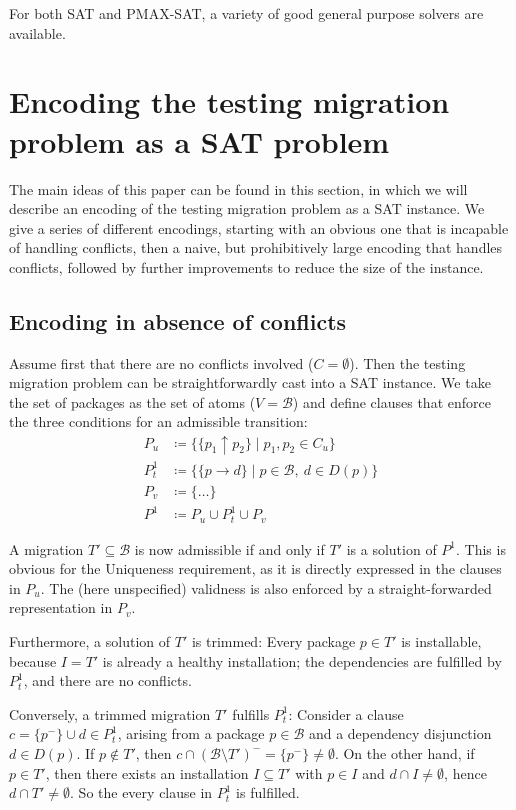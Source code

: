 \documentclass[halfparskip,11pt]{scrartcl}
\begin{document}
For both SAT and PMAX-SAT, a variety of good general purpose solvers are available.

\section{Encoding the testing migration problem as a SAT problem}

The main ideas of this paper can be found in this section, in which we will describe an encoding of the testing migration problem as a SAT instance. We give a series of different encodings, starting with an obvious one that is incapable of handling conflicts, then a naive, but prohibitively large encoding that handles conflicts, followed by further improvements to reduce the size of the instance.

\subsection{Encoding in absence of conflicts}

Assume first that there are no conflicts involved ($C = \emptyset$). Then the testing migration problem can be straightforwardly cast into a SAT instance. We take the set of packages as the set of atoms ($V=\mathcal B$) and define clauses that enforce the three conditions for an admissible transition:
\begin{align*}
P_u &\coloneqq \{ \{p_1 \uparrow p_2\} \mid p_1,p_2 \in C_u\} \\
P_t^1 &\coloneqq \{ \{ p \to d \} \mid p\in \mathcal B,\ d \in D(p)\}\\
P_v &\coloneqq \{ \ldots \} \\
P^1 &\coloneqq P_u \cup P^1_t \cup P_v
\end{align*}

A migration $T'\subseteq \mathcal B$ is now admissible if and only if $T'$ is a solution of $P^1$. This is obvious for the Uniqueness requirement, as it is directly expressed in the clauses in $P_u$. The (here unspecified) validness is also enforced by a straight-forwarded representation in $P_v$.

Furthermore, a solution of $T'$ is trimmed: Every package $p\in T'$ is installable, because $I=T'$ is already a healthy installation; the dependencies are fulfilled by $P^1_t$, and there are no conflicts.

Conversely, a trimmed migration $T'$ fulfills $P^1_t$: Consider a clause $c=\{p^-\}\cup d\in P^1_t$, arising from a package $p\in \mathcal B$ and a dependency disjunction $d\in D(p)$. If $p\notin T'$, then $c\cap (\mathcal B\setminus T')^- = \{p^-\} \ne \emptyset$. On the other hand, if $p\in T'$, then there exists an installation $I\subseteq T'$ with $p\in I$ and $d\cap I \ne \emptyset$, hence $d\cap T'\ne\emptyset$. So the every clause in $P^1_t$ is fulfilled.
\end{document}
